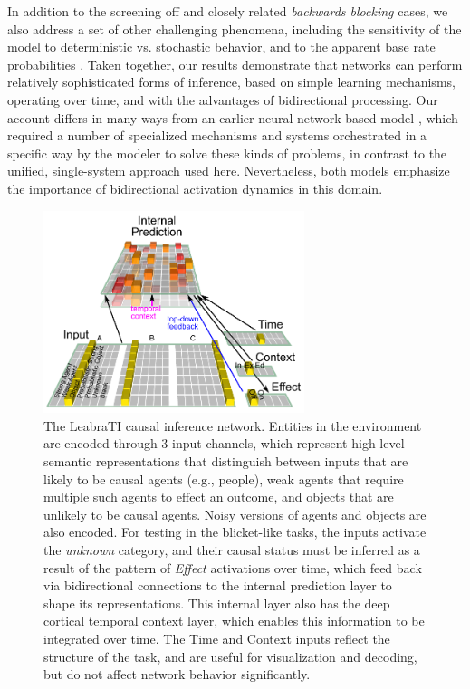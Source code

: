 \documentclass[11pt,twoside]{article}
\newif\myifpdf
\begin{document}
In addition to the screening off and closely related {\em backwards blocking} cases, we also address a set of other challenging phenomena, including the sensitivity of the model to deterministic vs. stochastic behavior, and to the apparent base rate probabilities \cite{SobelTenenbaumGopnik04,LucasGriffiths10}.  Taken together, our results demonstrate that networks can perform relatively sophisticated forms of inference, based on simple learning mechanisms, operating over time, and with the advantages of bidirectional processing.  Our account differs in many ways from an earlier neural-network based model \cite{McClellandThompson07}, which required a number of specialized mechanisms and systems orchestrated in a specific way by the modeler to solve these kinds of problems, in contrast to the unified, single-system approach used here.  Nevertheless, both models emphasize the importance of bidirectional activation dynamics in this domain.

\begin{figure}
  \centering\includegraphics[width=3in]{figs/fig_blicket_net}
  \caption{\small The LeabraTI causal inference network.  Entities in the environment are encoded through 3 input channels, which represent high-level semantic representations that distinguish between inputs that are likely to be causal agents (e.g., people), weak agents that require multiple such agents to effect an outcome, and objects that are unlikely to be causal agents.  Noisy versions of agents and objects are also encoded.  For testing in the blicket-like tasks, the inputs activate the {\em unknown} category, and their causal status must be inferred as a result of the pattern of {\em Effect} activations over time, which feed back via bidirectional connections to the internal prediction layer to shape its representations.  This internal layer also has the deep cortical temporal context layer, which enables this information to be integrated over time.  The Time and Context inputs reflect the structure of the task, and are useful for visualization and decoding, but do not affect network behavior significantly.}
  \label{fig.net}
\end{figure}
\end{document}
